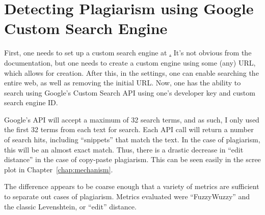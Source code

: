 \chapter{Detecting Plagiarism using Google Custom Search Engine}
\label{app:detecting-plagiarism}


First, one needs to set up a custom search engine at
\href{http://www.google.com/cse}. It's not obvious from the documentation, but
one needs to create a custom engine using some (any) URL, which allows for
creation. After this, in the settings, one can enable searching the entire web,
as well as removing the initial URL. Now, one has the ability to search using
Google's Custom Search API using one's developer key and custom search engine
ID.

Google's API will accept a maximum of 32 search terms, and as such, I only used
the first 32 terms from each text for search. Each API call will return a number
of search hits, including “snippets” that match the text. In the case of
plagiarism, this will be an almost exact match. Thus, there is a drastic
decrease in “edit distance” in the case of copy-paste plagiarism. This can be
seen easily in the scree plot in Chapter~\ref{chap:mechanism}.

The difference appears to be coarse enough that a variety of metrics are
sufficient to separate out cases of plagiarism. Metrics evaluated were
“FuzzyWuzzy” and the classic Levenshtein, or “edit” distance.
